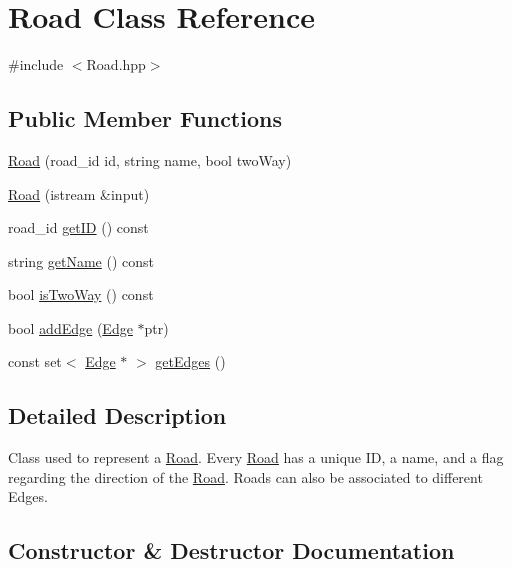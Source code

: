 \hypertarget{class_road}{}\section{Road Class Reference}
\label{class_road}


{\ttfamily \#include $<$Road.\+hpp$>$}

\subsection*{Public Member Functions}
\begin{DoxyCompactItemize}
\item 
\hyperlink{class_road_a4bd6abfd59885bb839dff8642b32db92}{Road} (road\+\_\+id id, string name, bool two\+Way)
\item 
\hyperlink{class_road_a96d7a3bee9ce4ea3ed6ed8eb24298085}{Road} (istream \&input)
\item 
road\+\_\+id \hyperlink{class_road_a4e0440c1d5bf11800f0df3c50dcb4b92}{get\+ID} () const
\item 
string \hyperlink{class_road_ae7c959eda8a11bc859ab5de5e278b735}{get\+Name} () const
\item 
bool \hyperlink{class_road_a9c412810b3a630a759f199c60f7f1cc6}{is\+Two\+Way} () const
\item 
bool \hyperlink{class_road_a7a691f98e8bd53299ed2539de1e4d13c}{add\+Edge} (\hyperlink{class_edge}{Edge} $\ast$ptr)
\item 
const set$<$ \hyperlink{class_edge}{Edge} $\ast$ $>$ \hyperlink{class_road_a03fb1c0a74b860e4be6c951154add098}{get\+Edges} ()
\end{DoxyCompactItemize}


\subsection{Detailed Description}
Class used to represent a \hyperlink{class_road}{Road}. Every \hyperlink{class_road}{Road} has a unique ID, a name, and a flag regarding the direction of the \hyperlink{class_road}{Road}. Roads can also be associated to different Edges. 

\subsection{Constructor \& Destructor Documentation}
\hypertarget{class_road_a4bd6abfd59885bb839dff8642b32db92}{}\label{class_road_a4bd6abfd59885bb839dff8642b32db92} 

